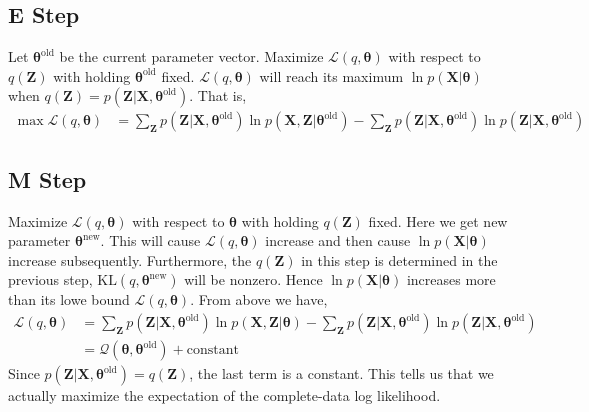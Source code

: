 \documentclass[../main.tex]{subfiles}
\begin{document}
        \subsection{E Step}
        Let $\boldsymbol{\theta}^{\mathrm{old}}$ be the current parameter vector. Maximize $\mathcal{L}(q,\boldsymbol{\theta})$ with respect to $q(\mathbf{Z})$ with holding $\boldsymbol{\theta}^{\mathrm{old}}$ fixed. $\mathcal{L}(q,\boldsymbol{\theta})$ will reach its maximum $\ln p(\mathbf{X}|\boldsymbol{\theta})$ when $q(\mathbf{Z})=p(\mathbf{Z}|\mathbf{X},\boldsymbol{\theta}^\mathrm{old})$. That is,
        \begin{align*}
            \max\mathcal{L}(q,\boldsymbol{\theta})&=\sum_{\mathbf{Z}}p(\mathbf{Z}|\mathbf{X},\boldsymbol{\theta}^{\mathrm{old}})\ln p(\mathbf{X},\mathbf{Z}|\boldsymbol{\theta}^\mathrm{old}) - \sum_{\mathbf{Z}}p(\mathbf{Z}|\mathbf{X},\boldsymbol{\theta}^{\mathrm{old}})\ln p(\mathbf{Z}|\mathbf{X},\boldsymbol{\theta}^{\mathrm{old}})
        \end{align*}
        \subsection{M Step}
        Maximize $\mathcal{L}(q,\boldsymbol{\theta})$ with respect to $\boldsymbol{\theta}$ with holding $q(\mathbf{Z})$ fixed. 
        Here we get new parameter $\boldsymbol{\theta}^{\mathrm{new}}$. This will cause $\mathcal{L}(q,\boldsymbol{\theta})$ increase and then cause $\ln p(\mathbf{X}|\boldsymbol{\theta})$ increase subsequently. Furthermore, the $q(\mathbf{Z})$ in this step is determined in the previous step, $\mathrm{KL}(q,\boldsymbol{\theta}^{\mathrm{new}})$ will be nonzero. Hence $\ln p(\mathbf{X}|\boldsymbol{\theta})$ increases more than its lowe bound $\mathcal{L}(q,\boldsymbol{\theta})$. From above we have,
        \begin{align*}
            \mathcal{L}(q,\boldsymbol{\theta})&=\sum_{\mathbf{Z}}p(\mathbf{Z}|\mathbf{X},\boldsymbol{\theta}^\mathrm{old})\ln p(\mathbf{X},\mathbf{Z}|\boldsymbol{\theta})-\sum_{\mathbf{Z}}p(\mathbf{Z}|\mathbf{X},\boldsymbol{\theta}^\mathrm{old})\ln p(\mathbf{Z}|\mathbf{X},\boldsymbol{\theta}^\mathrm{old})\\
            &=\mathcal{Q}(\boldsymbol{\theta},\boldsymbol{\theta}^\mathrm{old}) + \mathrm{constant}
        \end{align*}
        Since $p(\mathbf{Z}|\mathbf{X},\boldsymbol{\theta}^\mathrm{old}) = q(\mathbf{Z})$, the last term is a constant. This tells us that we actually maximize the expectation of the complete-data log likelihood.
\end{document}
